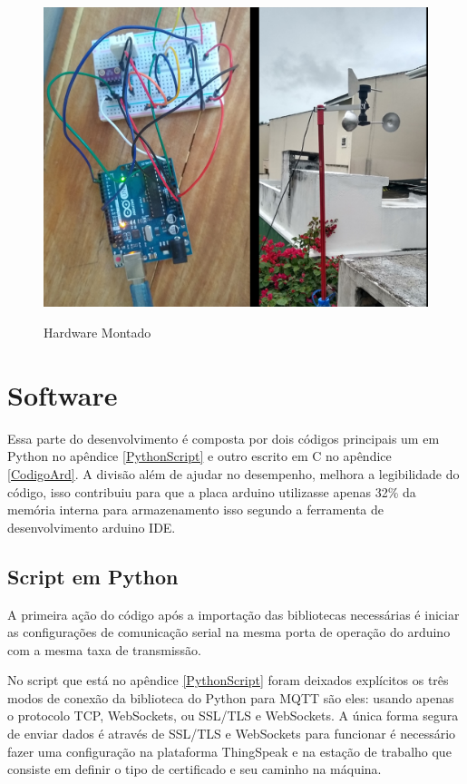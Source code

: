 \begin{figure} [!h]
    \centering
    \caption{Hardware Montado}
    \includegraphics [scale=0.40]{Figuras/Hardware_Estacao.jpg}
    \label{fig:estacao_hardware}
\end{figure}

\section{Software}

Essa parte do desenvolvimento é composta por dois códigos principais um em Python no apêndice \ref{PythonScript} e outro escrito em C no apêndice \ref{CodigoArd}. A divisão além de ajudar no desempenho, melhora a legibilidade do código, isso contribuiu para que a placa arduino utilizasse apenas 32\% da memória interna para armazenamento isso segundo a ferramenta de desenvolvimento arduino IDE.

\subsection{Script em Python}

A primeira ação do código após a importação das bibliotecas necessárias é iniciar as configurações de comunicação serial na mesma porta de operação do arduino com a mesma taxa de transmissão.

No script que está no apêndice \ref{PythonScript} foram deixados explícitos os três modos de conexão da biblioteca do Python para MQTT são eles: usando apenas o protocolo TCP, WebSockets, ou SSL/TLS e WebSockets. A única forma segura de enviar dados é através de SSL/TLS e WebSockets para funcionar é necessário fazer uma configuração na plataforma ThingSpeak e na estação de trabalho que consiste em definir o tipo de certificado e seu caminho na máquina.

